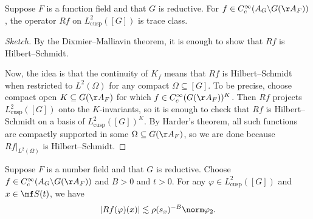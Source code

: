 \documentclass{article}
\begin{document}
\begin{corollary}
	Suppose $F$ is a function field and that $G$ is reductive. For $f\in C_c^\infty(A_G\backslash G(\AA_F))$, the operator $Rf$ on $L^2_{\mathrm{cusp}}([G])$ is trace class.
\end{corollary}
\begin{proof}[Sketch]
	By the Dixmier--Malliavin theorem, it is enough to show that $Rf$ is Hilbert--Schmidt.
	
	Now, the idea is that the continuity of $K_f$ means that $Rf$ is Hilbert--Schmidt when restricted to $L^2(\Omega)$ for any compact $\Omega\subseteq[G]$. To be precise, choose compact open $K\subseteq G(\AA_F)$ for which $f\in C_c^\infty(G(\AA_F))^K$. Then $Rf$ projects $L^2_{\mathrm{cusp}}([G])$ onto the $K$-invariants, so it is enough to check that $Rf$ is Hilbert--Schmidt on a basis of $L^2_{\mathrm{cusp}}([G])^K$. By Harder's theorem, all such functions are compactly supported in some $\Omega\subseteq G(\AA_F)$, so we are done because $Rf|_{L^2(\Omega)}$ is Hilbert--Schmidt.
\end{proof}
\begin{theorem}
	Suppose $F$ is a number field and that $G$ is reductive. Choose $f\in C_c^\infty(A_G\backslash G(\AA_F))$ and $B>0$ and $t>0$. For any $\varphi\in L^2_{\mathrm{cusp}}([G])$ and $x\in\mf S(t)$, we have
	\[\left|Rf(\varphi)(x)\right|\lesssim\rho(s_x)^{-B}\norm\varphi_2.\]
\end{theorem}
\end{document}
